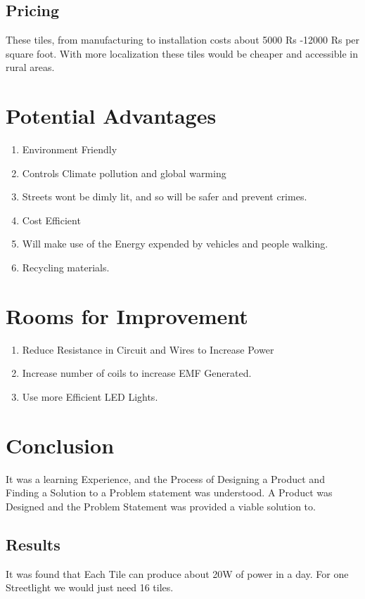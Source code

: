 \documentclass[11pt]{article}
\begin{document}
\subsection{Pricing}
These tiles, from manufacturing to installation costs about 5000 Rs -12000 Rs per square foot. With more localization these tiles would be cheaper and accessible in rural areas.
\section{Potential Advantages}
\begin{enumerate}
	\item Environment Friendly
	\item Controls Climate pollution and global warming
	\item Streets wont be dimly lit, and so will be safer and prevent crimes. 
	\item Cost Efficient
	\item Will make use of the Energy expended by vehicles and people walking.
	\item Recycling materials.
\end{enumerate}

\section{Rooms for Improvement}
\begin{enumerate}
	\item Reduce Resistance in Circuit and Wires to Increase Power
	\item Increase number of coils to increase EMF Generated.
	\item Use more Efficient LED Lights.
\end{enumerate}


\section{Conclusion}
It was a learning Experience, and the Process of Designing a Product and Finding a Solution to a Problem statement was understood. A Product was Designed and the Problem Statement was provided a viable solution to. 
\subsection{Results}
It was found that Each Tile can produce about 20W of power in a day. For one Streetlight we would just need 16 tiles.
\end{document}
